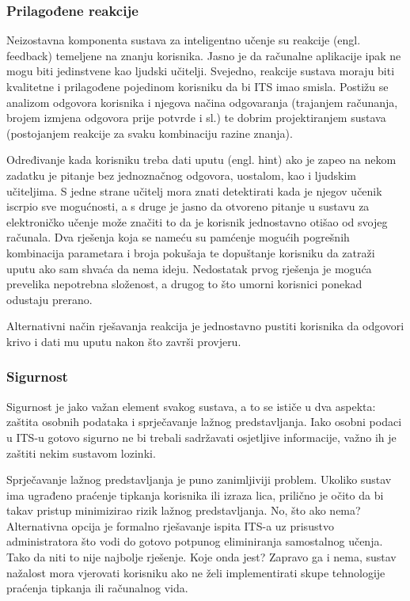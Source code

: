 \documentclass[times, utf8, zavrsni, numeric]{fer}
\begin{document}
\subsubsection{Prilagođene reakcije}
Neizostavna komponenta sustava za inteligentno učenje su reakcije (engl. feedback) temeljene na znanju korisnika.\cite{feedback} Jasno je da računalne aplikacije ipak ne mogu biti jedinstvene kao ljudski učitelji. Svejedno, reakcije sustava moraju biti kvalitetne i prilagođene pojedinom korisniku da bi ITS imao smisla. Postižu se analizom odgovora korisnika i njegova načina odgovaranja (trajanjem računanja, brojem izmjena odgovora prije potvrde i sl.) te dobrim projektiranjem sustava (postojanjem reakcije za svaku kombinaciju razine znanja).\cite{aect}
\par
Određivanje kada korisniku treba dati uputu (engl. hint) ako je zapeo na nekom zadatku je pitanje bez jednoznačnog odgovora, uostalom, kao i ljudskim učiteljima. S jedne strane učitelj mora znati detektirati kada je njegov učenik iscrpio sve mogućnosti, a s druge je jasno da otvoreno pitanje u sustavu za elektroničko učenje može značiti to da je korisnik jednostavno otišao od svojeg računala. Dva rješenja koja se nameću su pamćenje mogućih pogrešnih kombinacija parametara i broja pokušaja te dopuštanje korisniku da zatraži uputu ako sam shvaća da nema ideju. Nedostatak prvog rješenja je moguća prevelika nepotrebna složenost, a drugog to što umorni korisnici ponekad odustaju prerano.
\par
Alternativni način rješavanja reakcija je jednostavno pustiti korisnika da odgovori krivo i dati mu uputu nakon što završi provjeru.

\subsubsection{Sigurnost}
Sigurnost je jako važan element svakog sustava, a to se ističe u dva aspekta: zaštita osobnih podataka i sprječavanje lažnog predstavljanja. Iako osobni podaci u ITS-u gotovo sigurno ne bi trebali sadržavati osjetljive informacije, važno ih je zaštiti nekim sustavom lozinki.\cite{security}
\par
Sprječavanje lažnog predstavljanja je puno zanimljiviji problem. Ukoliko sustav ima ugrađeno praćenje tipkanja korisnika ili izraza lica, prilično je očito da bi takav pristup minimizirao rizik lažnog predstavljanja. No, što ako nema? Alternativna opcija je formalno rješavanje ispita ITS-a uz prisustvo administratora što vodi do gotovo potpunog eliminiranja samostalnog učenja. Tako da niti to nije najbolje rješenje. Koje onda jest? Zapravo ga i nema, sustav nažalost mora vjerovati korisniku ako ne želi implementirati skupe tehnologije praćenja tipkanja ili računalnog vida.
\end{document}
